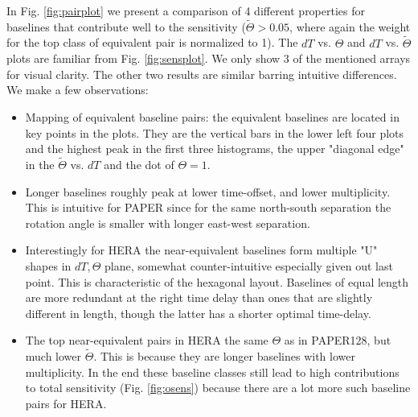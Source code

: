 \documentclass[twocolumn,apj,numberedappendix]{emulateapj}
\renewcommand\[{\begin{equation}}
\renewcommand\]{\end{equation}}
\begin{document}
In Fig. \ref{fig:pairplot} we present a comparison of 4 different properties for baselines that contribute well to the sensitivity ($\widetilde{\Theta}>0.05$, where again the weight for the top class of equivalent pair is normalized to 1). The $dT$ vs. $\Theta$ and $dT$ vs. $\widetilde{\Theta}$ plots are familiar from Fig. \ref{fig:sensplot}. We only show 3 of the mentioned arrays for visual clarity. The other two results are similar barring intuitive differences. We make a few observations:
\begin{itemize}

\item Mapping of equivalent baseline pairs: the equivalent baselines are located in key points in the plots. They are the vertical bars in the lower left four plots and the highest peak in the first three histograms, the upper "diagonal edge" in the $\widetilde{\Theta}$ vs. $dT$ and the dot of $\Theta=1$. 


\item Longer baselines roughly peak at lower time-offset, and lower multiplicity. This is intuitive for PAPER since  for the same north-south separation the rotation angle is smaller with longer east-west separation. 

\item Interestingly for HERA the near-equivalent baselines form multiple "U" shapes in $dT, \Theta$ plane, somewhat counter-intuitive especially given out last point. This is characteristic of the hexagonal layout. Baselines of equal length are more redundant at the right time delay than ones that are slightly different in length, though the latter has a shorter optimal time-delay. 
 
\item The top near-equivalent pairs in HERA the same $\Theta$ as in PAPER128, but much lower $\widetilde{\Theta}$. This is because they are longer baselines with lower multiplicity. In the end these baseline classes still lead to high contributions to total sensitivity (Fig. \ref{fig:osens}) because there are a lot more such baseline pairs for HERA.  




\end{itemize}




\end{document}
